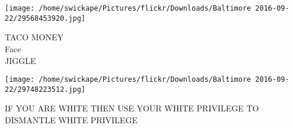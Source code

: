 \documentclass[10pt,letterpaper]{article}
\begin{document}
\vspace{0.25in}
\texttt{[image: /home/swickape/Pictures/flickr/Downloads/Baltimore 2016-09-22/29568453920.jpg]}

TACO MONEY\\
Face\\
JIGGLE\\
\pagebreak

\texttt{[image: /home/swickape/Pictures/flickr/Downloads/Baltimore 2016-09-22/29748223512.jpg]}

IF YOU ARE WHITE THEN USE YOUR WHITE PRIVILEGE TO DISMANTLE WHITE PRIVILEGE\\
\pagebreak
\end{document}
